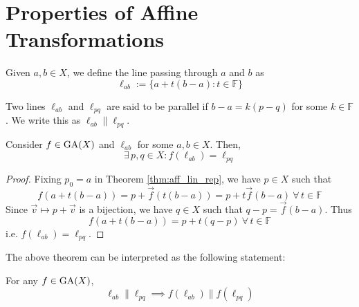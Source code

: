 \section{Properties of Affine Transformations}

\begin{definition}
    Given $a,b \in X$, we define the line passing through $a$ and $b$ as
    \[ \ell_{ab}:=\{a+t(b-a)\colon t\in\mathbb{F}\} \]
\end{definition}

\begin{definition}
    Two lines $\ell_{ab}$ and $\ell_{pq}$ are said to be parallel if
    $b-a=k(p-q)$ for some $k\in\mathbb{F}$. We write this
    as $\ell_{ab}\parallel\ell_{pq}$.
\end{definition}

\begin{theorem}
    Consider $f\in\operatorname{GA}(X)$ and $\ell_{ab}$ for some $a,b \in X$. Then,
    \[ \exists\,p,q \in X\colon f(\ell_{ab})=\ell_{pq} \]
\end{theorem}

\begin{proof}
    Fixing $p_0=a$ in Theorem \ref{thm:aff_lin_rep}, we have $p \in X$ such that
    \[ f(a+t(b-a))=p+\vec{f}(t(b-a))=p+t\vec{f}(b-a)\ \forall\,t\in\mathbb{F} \]
    Since $\vec{v} \mapsto p+\vec{v}$ is a bijection, we have $q \in X$ such that
    $q-p=\vec{f}(b-a)$. Thus
    \[ f(a+t(b-a))=p+t(q-p)\ \forall\,t\in\mathbb{F} \]
    i.e. $f(\ell_{ab})=\ell_{pq}$.
\end{proof}

The above theorem can be interpreted as the following statement:
\vspace{1ex}

\begin{center}
\end{center}
\vspace{1ex}

\begin{theorem}
    For any $f\in\operatorname{GA}(X)$,
    \[ \ell_{ab} \parallel \ell_{pq} \implies f(\ell_{ab}) \parallel f(\ell_{pq}) \]
\end{theorem}

